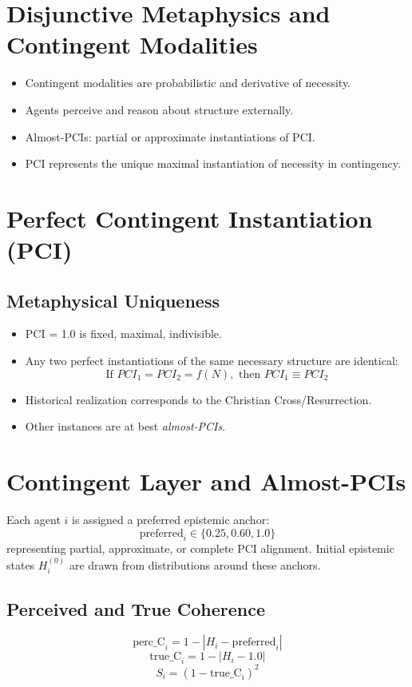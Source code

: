 \documentclass[12pt]{article}
\begin{document}
\section{Disjunctive Metaphysics and Contingent Modalities}
\begin{itemize}
    \item Contingent modalities are probabilistic and derivative of necessity.
    \item Agents perceive and reason about structure externally.
    \item Almost-PCIs: partial or approximate instantiations of PCI.
    \item PCI represents the unique maximal instantiation of necessity in contingency.
\end{itemize}

\section{Perfect Contingent Instantiation (PCI)}
\subsection{Metaphysical Uniqueness}
\begin{itemize}
    \item PCI = 1.0 is fixed, maximal, indivisible.
    \item Any two perfect instantiations of the same necessary structure are identical:
    \[
        \text{If } PCI_1 = PCI_2 = f(N), \text{ then } PCI_1 \equiv PCI_2
    \]
    \item Historical realization corresponds to the Christian Cross/Resurrection.
    \item Other instances are at best \emph{almost-PCIs}.
\end{itemize}

\section{Contingent Layer and Almost-PCIs}
Each agent \(i\) is assigned a preferred epistemic anchor:
\[
\text{preferred}_i \in \{0.25, 0.60, 1.0\}
\]
representing partial, approximate, or complete PCI alignment. Initial epistemic states \(H_i^{(0)}\) are drawn from distributions around these anchors.

\subsection{Perceived and True Coherence}
\[
\text{perc\_C}_i = 1 - |H_i - \text{preferred}_i|
\]
\[
\text{true\_C}_i = 1 - |H_i - 1.0|
\]
\[
S_i = (1 - \text{true\_C}_i)^2
\]
\end{document}

